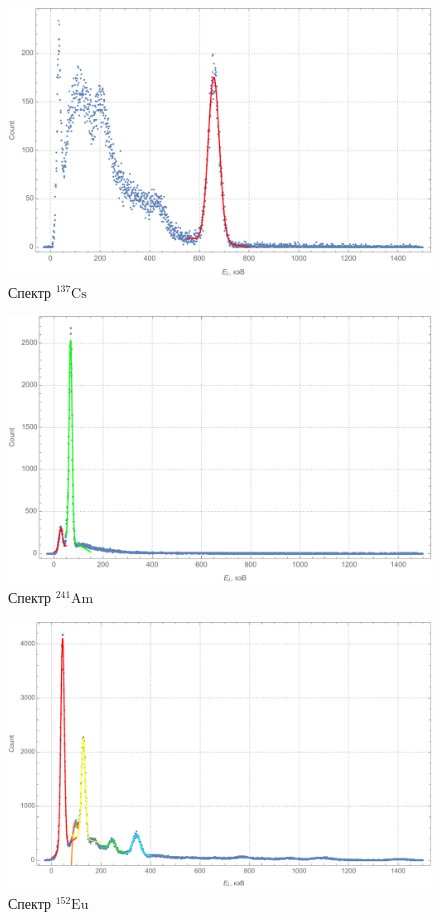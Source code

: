 \documentclass[a4paper, 12pt]{article}
\begin{document}
\begin{figure}[!htb]
\centering
\includegraphics[scale=0.65]{cs137.pdf}
\caption{Спектр $^{137}\text{Cs}$}
\end{figure}
\begin{figure}[!htb]
\centering
\includegraphics[scale=0.7]{am241.pdf}
\caption{Спектр $^{241}\text{Am}$}
\end{figure}
\begin{figure}[!htb]
\centering
\includegraphics[scale=0.7]{eu152.pdf}
\caption{Спектр $^{152}\text{Eu}$}
\end{figure}
\end{document}
